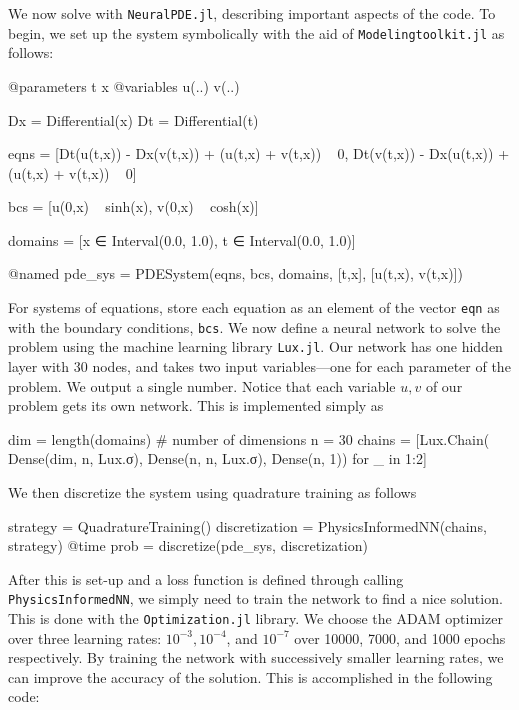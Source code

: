 \documentclass{CUP-JNL-DTM}%
\theoremstyle{definition}
\numberwithin{equation}{section}
\begin{document}
We now solve with \texttt{NeuralPDE.jl}, describing important aspects of the code. To begin, we set up the system symbolically with the aid of \texttt{Modelingtoolkit.jl} as follows:

\begin{jllisting}
@parameters t x
@variables u(..) v(..)

Dx = Differential(x)
Dt = Differential(t)

eqns = [Dt(u(t,x)) - Dx(v(t,x)) + (u(t,x) + v(t,x)) ~ 0,
        Dt(v(t,x)) - Dx(u(t,x)) + (u(t,x) + v(t,x)) ~ 0]

bcs = [u(0,x) ~ sinh(x), v(0,x) ~ cosh(x)]

domains = [x ∈ Interval(0.0, 1.0),
            t ∈ Interval(0.0, 1.0)]

@named pde_sys = PDESystem(eqns, bcs, domains, [t,x], [u(t,x), v(t,x)])
\end{jllisting}
For systems of equations, store each equation as an element of the vector \texttt{eqn} as with the boundary conditions, \texttt{bcs}. We now define a neural network to solve the problem using the machine learning library \texttt{Lux.jl}. Our network has one hidden layer with 30 nodes, and takes two input variables---one for each parameter of the problem. We output a single number. Notice that each variable $u,v$ of our problem gets its own network. This is implemented simply as

\begin{jllisting}
dim = length(domains) # number of dimensions
n = 30
chains = [Lux.Chain(
            Dense(dim, n, Lux.σ), 
            Dense(n, n, Lux.σ), 
            Dense(n, 1)) for _ in 1:2]
\end{jllisting}
We then discretize the system using quadrature training as follows

\begin{jllisting}
strategy = QuadratureTraining()
discretization = PhysicsInformedNN(chains, strategy)
@time prob = discretize(pde_sys, discretization)
\end{jllisting}
After this is set-up and a loss function is defined through calling \texttt{PhysicsInformedNN}, we simply need to train the network to find a nice solution. This is done with the \texttt{Optimization.jl} library. We choose the ADAM optimizer over three learning rates: $10^{-3}, 10^{-4}$, and $10^{-7}$ over 10000, 7000, and 1000 epochs respectively. By training the network with successively smaller learning rates, we can improve the accuracy of the solution. This is accomplished in the following code:
\end{document}
